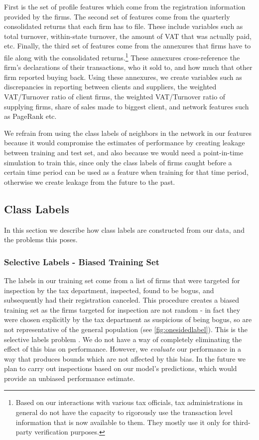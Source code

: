 First is the set of profile features which come from the registration information provided by the firms. The second set of features come from the quarterly consolidated returns that each firm has to file. These include variables such as total turnover, within-state turnover, the amount of VAT that was actually paid, etc. 
Finally, the third set of features come from the annexures that firms have to file along with the consolidated returns.\footnote{Based on our interactions with various tax officials, tax administrations in general do not have the capacity to rigorously use the transaction level information that is now available to them. They mostly use it only for third-party verification purposes.} These annexures cross-reference the firm's declarations of their transactions, who it sold to, and how much that other firm reported buying back. Using these annexures, we create variables such as discrepancies in reporting between clients and suppliers, the weighted VAT/Turnover ratio of client firms, the weighted VAT/Turnover ratio of supplying firms, share of sales made to biggest client, and network features such as PageRank etc. 

We refrain from using the class labels of neighbors in the network in our features because it would compromise the estimates of performance by creating leakage between training and test set, and also because we would need a point-in-time simulation to train this, since only the class labels of firms caught before a certain time period can be used as a feature when training for that time period, otherwise we create leakage from the future to the past. 

\subsection{Class Labels}
\label{subsec:class-labels} 
In this section we describe how class labels are constructed from our data, and the problems this poses.

\subsubsection{Selective Labels - Biased Training Set}
\label{subsubsec:biased-training-set} 
The labels in our training set come from a list of firms that were targeted for inspection by the tax department, inspected, found to be bogus, and subsequently had their registration canceled. This procedure creates a biased training set as the firms targeted for inspection are not random - in fact they were chosen explicitly by the tax department as suspicious of being bogus, so are not representative of the general population (see \cref{fig:onesidedlabel}). This is the selective labels problem \cite{lakkaraju2017selective}.  We do not have a way of completely eliminating the effect of this bias on performance. However, we \textit{evaluate} our performance in a way that produces bounds which are not affected by this bias. In the future we plan to carry out inspections based on our model's predictions, which would provide an unbiased performance estimate.

